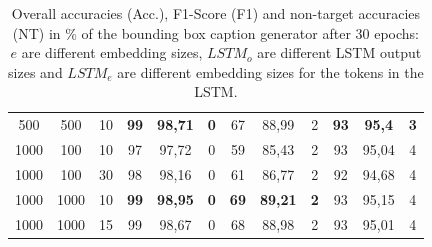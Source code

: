 \begin{table}[ht]
\begin{tabular}{ccc|ccc|ccc|ccc}
        {500}  & {500}    & {10}     & \textbf{99}                         & \textbf{98,71}                      & \textbf{0}                               & {67}          & {88,99}        & {2}         & \textbf{93}   & \textbf{95,4}  & \textbf{3}  \\
        {1000} & {100}    & {10}     & {97}                                & {97,72}                             & {0}                                      & {59}          & {85,43}        & {2}         & {93}          & {95,04}        & {4}         \\
        {1000} & {100}    & {30}     & {98}                                & {98,16}                             & {0}                                      & {61}          & {86,77}        & {2}         & {92}          & {94,68}        & {4}         \\
        {1000} & {1000}   & {10}     & \textbf{99}                         & \textbf{98,95}                      & \textbf{0}                               & \textbf{69}   & \textbf{89,21} & \textbf{2}  & {93}          & {95,15}        & {4}         \\
        {1000} & {1000}   & {15}     & {99}                                & {98,67}                             & {0}                                      & {68}          & {88,98}        & {2}         & {93}          & {95,01}        & {4}         \\
        \bottomrule
    \end{tabular}
    \caption{Overall accuracies (Acc.), F1-Score (F1) and non-target accuracies (NT) in \% of the bounding box caption generator after 30 epochs: $e$ are different embedding sizes, $LSTM_o$ are different LSTM output sizes and $LSTM_e$ are different embedding sizes for the tokens in the LSTM.}
    \label{tab:results:bb-re-generator}
\end{table}


